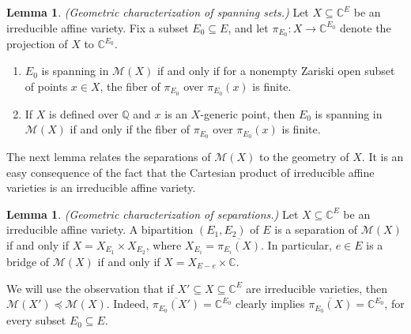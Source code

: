 \documentclass[11pt,a4paper,dvipsnames]{scrartcl}
\theoremstyle{definition}
\newtheorem{lemma}[theorem]{Lemma}
\newcommand{\CC}{\mathbb{C}}
\newcommand{\QQ}{\mathbb{Q}}
\newcommand{\algmat}[1]{\mathcal{M}(#1)}
\begin{document}
\begin{lemma}\label{lemma:algmatspanning} \emph{(Geometric characterization of spanning sets.)}\newline
    Let $X \subseteq \CC^E$ be an irreducible affine variety. Fix a subset $E_0 \subseteq E$, and let $\pi_{E_0}: X \rightarrow \CC^{E_0}$ denote the projection of $X$ to $\CC^{E_0}$. 
    \begin{enumerate}
        \item $E_0$ is spanning in $\algmat{X}$ if and only if for a nonempty Zariski open subset of points $x \in X$, the fiber of $\pi_{E_0}$ over $\pi_{E_0}(x)$ is finite.
        \item If $X$ is defined over $\QQ$ and $x$ is an $X$-generic point, then $E_0$ is spanning in $\algmat{X}$ if and only if the fiber of $\pi_{E_0}$ over $\pi_{E_0}(x)$ is finite.
    \end{enumerate}
\end{lemma}


The next lemma relates the separations of $\algmat{X}$ to the geometry of $X$. It is an easy consequence of the fact that the Cartesian product of irreducible affine varieties is an irreducible affine variety.
\begin{lemma}\label{lemma:algmatseparation}\cite[Lemma 3.1]{garamvolgyi.etal_2022} \emph{(Geometric characterization of separations.)}\newline
    Let $X \subseteq \CC^E$ be an irreducible affine variety. A bipartition $(E_1,E_2)$ of $E$ is a separation of $\algmat{X}$ if and only if $X = X_{E_1} \times X_{E_2}$, where $X_{E_i} = \overline{\pi_{E_i}(X)}$. In particular, $e \in E$ is a bridge of $\algmat{X}$ if and only if $X = X_{E-e} \times \CC$.
\end{lemma}

We will use the observation that if $X' \subseteq X \subseteq \CC^E$ are irreducible varieties, then $\algmat{X'} \preceq \algmat{X}$. Indeed, $\overline{\pi_{E_0}(X')} = \CC^{E_0}$ clearly implies $\overline{\pi_{E_0}(X)} = \CC^{E_0}$, for every subset $E_0 \subseteq E$.
\end{document}
